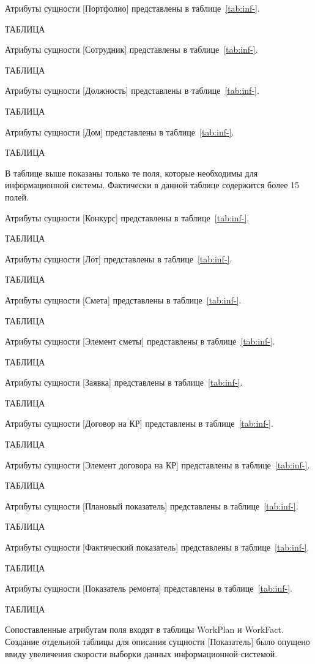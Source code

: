 Атрибуты сущности [Портфолио] представлены в таблице~\ref{tab:inf-}.

ТАБЛИЦА

Атрибуты сущности [Сотрудник] представлены в таблице~\ref{tab:inf-}.

ТАБЛИЦА

Атрибуты сущности [Должность] представлены в таблице~\ref{tab:inf-}.

ТАБЛИЦА

Атрибуты сущности [Дом] представлены в таблице~\ref{tab:inf-}.

ТАБЛИЦА

В таблице выше показаны только те поля, которые необходимы для информационной системы.
Фактически в данной таблице содержится более 15 полей.

Атрибуты сущности [Конкурс] представлены в таблице~\ref{tab:inf-}.

ТАБЛИЦА

Атрибуты сущности [Лот] представлены в таблице~\ref{tab:inf-}.

ТАБЛИЦА

Атрибуты сущности [Смета] представлены в таблице~\ref{tab:inf-}.

ТАБЛИЦА

Атрибуты сущности [Элемент сметы] представлены в таблице~\ref{tab:inf-}.

ТАБЛИЦА

Атрибуты сущности [Заявка] представлены в таблице~\ref{tab:inf-}.

ТАБЛИЦА

Атрибуты сущности [Договор на КР] представлены в таблице~\ref{tab:inf-}.

ТАБЛИЦА

Атрибуты сущности [Элемент договора на КР] представлены в таблице~\ref{tab:inf-}.

ТАБЛИЦА

Атрибуты сущности [Плановый показатель] представлены в таблице~\ref{tab:inf-}.

ТАБЛИЦА

Атрибуты сущности [Фактический показатель] представлены в таблице~\ref{tab:inf-}.

ТАБЛИЦА

Атрибуты сущности [Показатель ремонта] представлены в таблице~\ref{tab:inf-}.

ТАБЛИЦА

Сопоставленные атрибутам поля входят в таблицы {WorkPlan} и {WorkFact}.
Создание отдельной таблицы для описания сущности [Показатель] было опущено ввиду увеличения скорости выборки данных информационной системой.

